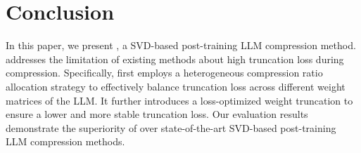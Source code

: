\vspace{-1mm}
\section{Conclusion}
\label{sec:conclusion}

\vspace{-2mm}
In this paper, we present \sysname, a SVD-based post-training LLM compression method. \sysname addresses the limitation of existing methods about high truncation loss during compression. Specifically, \sysname first employs a heterogeneous compression ratio allocation strategy to effectively balance truncation loss across different weight matrices of the LLM. It further introduces a loss-optimized weight truncation to ensure a lower and more stable truncation loss. 
Our evaluation results demonstrate the superiority of \sysname over state-of-the-art SVD-based post-training LLM compression methods.